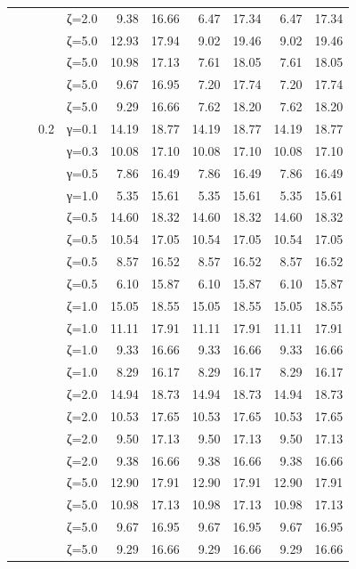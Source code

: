 \begin{table}[htbp]
\begin{tabular}{ll r l  rr  rr  rr}
  &  &  & ζ=2.0 & 9.38 & 16.66 & 6.47 & 17.34 & 6.47 & 17.34 \\
  &  &  & ζ=5.0 & 12.93 & 17.94 & 9.02 & 19.46 & 9.02 & 19.46 \\
  &  &  & ζ=5.0 & 10.98 & 17.13 & 7.61 & 18.05 & 7.61 & 18.05 \\
  &  &  & ζ=5.0 & 9.67 & 16.95 & 7.20 & 17.74 & 7.20 & 17.74 \\
  &  &  & ζ=5.0 & 9.29 & 16.66 & 7.62 & 18.20 & 7.62 & 18.20 \\
  &  & 0.2 & γ=0.1 & 14.19 & 18.77 & 14.19 & 18.77 & 14.19 & 18.77 \\
  &  &  & γ=0.3 & 10.08 & 17.10 & 10.08 & 17.10 & 10.08 & 17.10 \\
  &  &  & γ=0.5 & 7.86 & 16.49 & 7.86 & 16.49 & 7.86 & 16.49 \\
  &  &  & γ=1.0 & 5.35 & 15.61 & 5.35 & 15.61 & 5.35 & 15.61 \\
  &  &  & ζ=0.5 & 14.60 & 18.32 & 14.60 & 18.32 & 14.60 & 18.32 \\
  &  &  & ζ=0.5 & 10.54 & 17.05 & 10.54 & 17.05 & 10.54 & 17.05 \\
  &  &  & ζ=0.5 & 8.57 & 16.52 & 8.57 & 16.52 & 8.57 & 16.52 \\
  &  &  & ζ=0.5 & 6.10 & 15.87 & 6.10 & 15.87 & 6.10 & 15.87 \\
  &  &  & ζ=1.0 & 15.05 & 18.55 & 15.05 & 18.55 & 15.05 & 18.55 \\
  &  &  & ζ=1.0 & 11.11 & 17.91 & 11.11 & 17.91 & 11.11 & 17.91 \\
  &  &  & ζ=1.0 & 9.33 & 16.66 & 9.33 & 16.66 & 9.33 & 16.66 \\
  &  &  & ζ=1.0 & 8.29 & 16.17 & 8.29 & 16.17 & 8.29 & 16.17 \\
  &  &  & ζ=2.0 & 14.94 & 18.73 & 14.94 & 18.73 & 14.94 & 18.73 \\
  &  &  & ζ=2.0 & 10.53 & 17.65 & 10.53 & 17.65 & 10.53 & 17.65 \\
  &  &  & ζ=2.0 & 9.50 & 17.13 & 9.50 & 17.13 & 9.50 & 17.13 \\
  &  &  & ζ=2.0 & 9.38 & 16.66 & 9.38 & 16.66 & 9.38 & 16.66 \\
  &  &  & ζ=5.0 & 12.90 & 17.91 & 12.90 & 17.91 & 12.90 & 17.91 \\
  &  &  & ζ=5.0 & 10.98 & 17.13 & 10.98 & 17.13 & 10.98 & 17.13 \\
  &  &  & ζ=5.0 & 9.67 & 16.95 & 9.67 & 16.95 & 9.67 & 16.95 \\
  &  &  & ζ=5.0 & 9.29 & 16.66 & 9.29 & 16.66 & 9.29 & 16.66 \\

\end{tabular}
\end{table}
